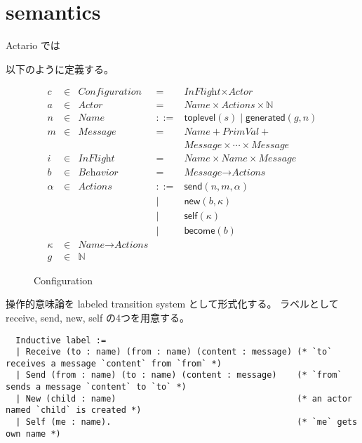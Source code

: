 \section{semantics}

Actario では

以下のように定義する。

\begin{figure}[t]
  \begin{displaymath}
    \begin{array}{rclcl}
      c & \in & \textit{Configuration} & =   & \textit{InFlight} \times \textit{Actor} \\
      a & \in & \textit{Actor}  & =   & \textit{Name} \times \textit{Actions} \times \mathbb{N} \\
      n & \in & \textit{Name}   & ::= & \textsf{toplevel}(s) \mid \textsf{generated}(g, n) \\
      m & \in & \textit{Message} & =  & \textit{Name} + \textit{PrimVal} + \\
        &     &                 &     & \textit{Message} \times \cdots \times \textit{Message} \\
      i & \in & \textit{InFlight} & = & \textit{Name} \times \textit{Name} \times \textit{Message} \\
      b & \in & \textit{Behavior} & = & \textit{Message} \rightarrow \textit{Actions} \\
      \alpha & \in & \textit{Actions} & ::= & \textsf{send}(n, m, \alpha) \\
        &     &                 &   | & \textsf{new}(b, \kappa) \\
        &     &                 &   | & \textsf{self}(\kappa) \\
        &     &                 &   | & \textsf{become}(b) \\
      \kappa & \in & \textit{Name} \rightarrow \textit{Actions} & & \\
      g & \in & \mathbb{N} & &
    \end{array}
  \end{displaymath}
  \caption{Configuration}\label{fig:config}
\end{figure}

操作的意味論を labeled transition system として形式化する。
ラベルとして receive, send, new, self の4つを用意する。

\begin{lstlisting}
  Inductive label :=
  | Receive (to : name) (from : name) (content : message) (* `to` receives a message `content` from `from` *)
  | Send (from : name) (to : name) (content : message)    (* `from` sends a message `content` to `to` *)
  | New (child : name)                                    (* an actor named `child` is created *)
  | Self (me : name).                                     (* `me` gets own name *)
\end{lstlisting}

